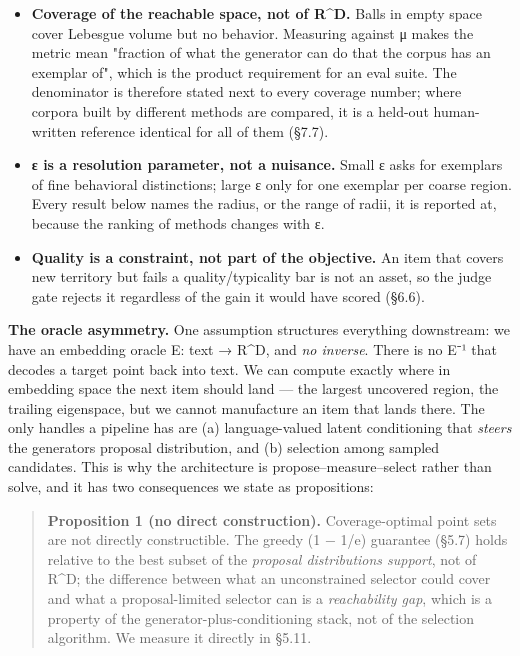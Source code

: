 \documentclass[
  10pt,
]{article}
\providecommand{\tightlist}{%
  \setlength{\itemsep}{0pt}\setlength{\parskip}{0pt}}
\theoremstyle{plain}
\theoremstyle{definition}
\providecommand{\tightlist}{\setlength{\itemsep}{0pt}\setlength{\parskip}{0pt}}
\begin{document}
\begin{itemize}
\tightlist
\item
  \textbf{Coverage of the reachable space, not of R\^{}D.} Balls in
  empty space cover Lebesgue volume but no behavior. Measuring against μ
  makes the metric mean "fraction of what the generator can do that the
  corpus has an exemplar of", which is the product requirement for an
  eval suite. The denominator is therefore stated next to every coverage
  number; where corpora built by different methods are compared, it is a
  held-out human-written reference identical for all of them (§7.7).
\item
  \textbf{ε is a resolution parameter, not a nuisance.} Small ε asks for
  exemplars of fine behavioral distinctions; large ε only for one
  exemplar per coarse region. Every result below names the radius, or
  the range of radii, it is reported at, because the ranking of methods
  changes with ε.
\item
  \textbf{Quality is a constraint, not part of the objective.} An item
  that covers new territory but fails a quality/typicality bar is not an
  asset, so the judge gate rejects it regardless of the gain it would
  have scored (§6.6).
\end{itemize}

\textbf{The oracle asymmetry.} One assumption structures everything
downstream: we have an embedding oracle E: text → R\^{}D, and \emph{no
inverse}. There is no E⁻¹ that decodes a target point back into text. We
can compute exactly where in embedding space the next item should land
--- the largest uncovered region, the trailing eigenspace, but we cannot
manufacture an item that lands there. The only handles a pipeline has
are (a) language-valued latent conditioning that \emph{steers} the
generator\textquotesingle s proposal distribution, and (b) selection
among sampled candidates. This is why the architecture is
propose--measure--select rather than solve, and it has two consequences
we state as propositions:

\begin{quote}
\textbf{Proposition 1 (no direct construction).} Coverage-optimal point
sets are not directly constructible. The greedy (1 − 1/e) guarantee
(§5.7) holds relative to the best subset of the \emph{proposal
distribution\textquotesingle s support}, not of R\^{}D; the difference
between what an unconstrained selector could cover and what a
proposal-limited selector can is a \emph{reachability gap}, which is a
property of the generator-plus-conditioning stack, not of the selection
algorithm. We measure it directly in §5.11.
\end{quote}
\end{document}

